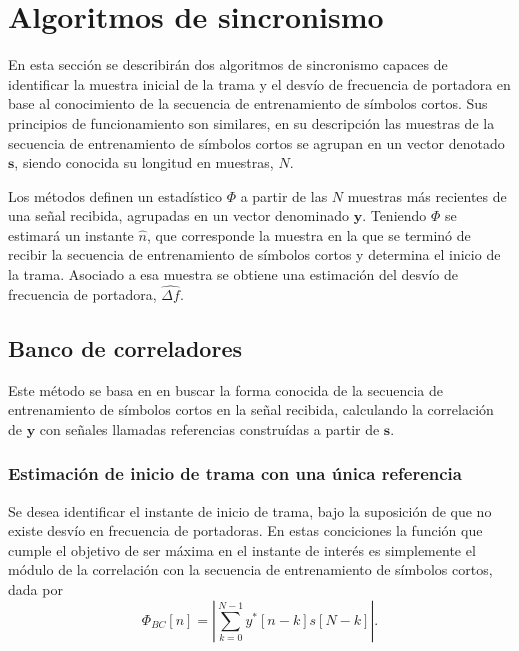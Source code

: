 \section{Algoritmos de sincronismo}

En esta sección se describirán dos algoritmos de sincronismo capaces de identificar la muestra inicial de la trama y el desvío de frecuencia de portadora en base al conocimiento de la secuencia de entrenamiento de símbolos cortos. Sus principios de funcionamiento son similares, en su descripción las muestras de la secuencia de entrenamiento de símbolos cortos se agrupan en un vector denotado $\mathbf{s}$, siendo conocida su longitud en muestras, $N$. 

Los métodos definen un estadístico $\Phi$ a partir de las $N$ muestras más recientes de una señal recibida, agrupadas en un vector denominado $\mathbf{y}$. Teniendo $\Phi$ se estimará un instante $\widehat{n}$, que corresponde la muestra en la que se terminó de recibir la secuencia de entrenamiento de símbolos cortos y determina el inicio de la trama. Asociado a esa muestra se obtiene una estimación del desvío de frecuencia de portadora, $\widehat{\Delta f}$. 

\subsection{Banco de correladores}
\label{S:ch3-banco}

Este método se basa en en buscar la forma conocida de la secuencia de entrenamiento de símbolos cortos en la señal recibida, calculando la correlación de $\mathbf{y}$ con señales llamadas referencias construídas a partir de $\mathbf{s}$. 

\subsubsection{Estimación de inicio de trama con una única referencia}

Se desea identificar el instante de inicio de trama, bajo la suposición de que no existe desvío en frecuencia de portadoras. En estas conciciones la función que cumple el objetivo de ser máxima en el instante de interés es simplemente el módulo de la correlación con la secuencia de entrenamiento de símbolos cortos, dada por
\begin{equation}\label{eq:correladores-1}
    \Phi_{BC}[n] = \left\lvert \sum_{k=0}^{N-1}y^\ast[n-k]s[N-k] \right\rvert.
\end{equation}

